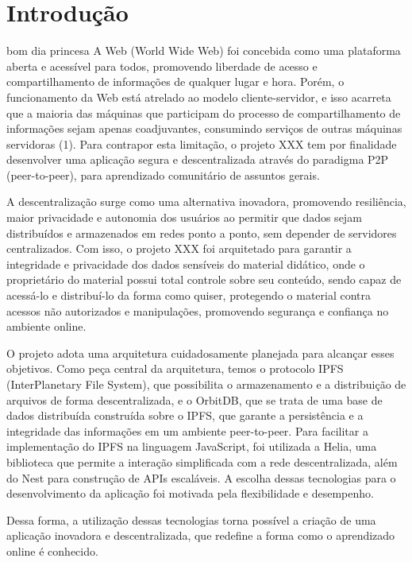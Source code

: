 \chapter[Introdução]{Introdução}
bom dia princesa
A Web (World Wide Web) foi concebida como uma plataforma aberta e acessível para todos, promovendo liberdade de acesso e compartilhamento de informações de qualquer lugar e hora. 
Porém, o funcionamento da Web está atrelado ao modelo cliente-servidor, e isso acarreta que a maioria das máquinas que participam do processo de compartilhamento de informações sejam apenas coadjuvantes, consumindo serviços de outras máquinas servidoras (1). Para contrapor esta limitação, o projeto XXX tem por finalidade desenvolver uma aplicação segura e descentralizada através do paradigma P2P (peer-to-peer), para aprendizado comunitário de assuntos gerais.

A descentralização surge como uma alternativa inovadora, promovendo resiliência, maior privacidade e autonomia dos usuários ao permitir que dados sejam distribuídos e armazenados em redes ponto a ponto, sem depender de servidores centralizados. Com isso, o projeto XXX foi arquitetado para garantir a integridade e privacidade dos dados sensíveis do material didático, onde o proprietário do material possui total controle sobre seu conteúdo, sendo capaz de acessá-lo e distribuí-lo da forma como quiser, protegendo o material contra acessos não autorizados e manipulações, promovendo segurança e confiança no ambiente online.

O projeto adota uma arquitetura cuidadosamente planejada para alcançar esses objetivos. Como peça central da arquitetura, temos o protocolo IPFS (InterPlanetary File System), que possibilita o armazenamento e a distribuição de arquivos de forma descentralizada, e o OrbitDB, que se trata de uma base de dados distribuída construída sobre o IPFS, que garante a persistência e a integridade das informações em um ambiente peer-to-peer. Para facilitar a implementação do IPFS na linguagem JavaScript, foi utilizada a Helia, uma biblioteca que permite a interação simplificada com a rede descentralizada, além do Nest para construção de APIs escaláveis. A escolha dessas tecnologias para o desenvolvimento da aplicação foi motivada pela flexibilidade e desempenho.

Dessa forma, a utilização dessas tecnologias torna possível a criação de uma aplicação inovadora e descentralizada, que redefine a forma como o aprendizado online é conhecido.

